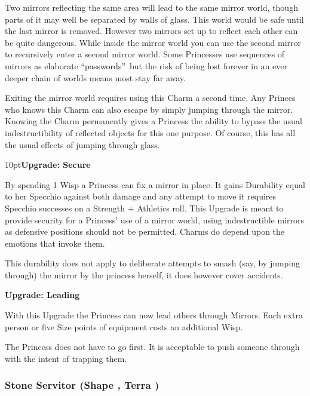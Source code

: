 Two mirrors reflecting the same area will lead to the same mirror world, though parts of it may well be separated by walls of glass. This world would be safe until the last mirror is removed. However two mirrors set up to reflect each other can be quite dangerous. While inside the mirror world you can use the second mirror to recursively enter a second mirror world. Some Princesses use sequences of mirrors as elaborate \textquotedblleft passwords\textquotedblright\, but the risk of being lost forever in an ever deeper chain of worlds means most stay far away.

Exiting the mirror world requires using this Charm a second time. Any Princes who knows this Charm can also escape by simply jumping through the mirror. Knowing the Charm permanently gives a Princess the ability to bypass the usual indestructibility of reflected objects for this one purpose. Of course, this has all the usual effects of jumping through glass. 

\begin{myindentpar}{10pt}\textbf{Upgrade: Secure}

By spending 1 Wisp a Princess can fix a mirror in place. It gains Durability equal to her Specchio against both damage and any attempt to move it requires Specchio successes on a Strength + Athletics roll. This Upgrade is meant to provide security for a Princess' use of a mirror world, using indestructible mirrors as defensive positions should not be permitted. Charms do depend upon the emotions that invoke them.

This durability does not apply to deliberate attempts to smash (say, by jumping through) the mirror by the princess herself, it does however cover accidents.

\textbf{Upgrade: Leading}

With this Upgrade the Princess can now lead others through Mirrors. Each extra person or five Size points of equipment costs an additional Wisp.

The Princess does not have to go first. It is acceptable to push someone through with the intent of trapping them.\end{myindentpar}


\subsubsection*{Stone Servitor (Shape \textbullet\textbullet\textbullet\textbullet\textbullet, Terra \textbullet\textbullet\textbullet)}


